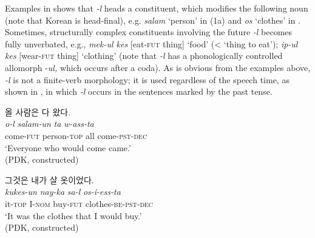 \documentclass[output=paper,colorlinks,citecolor=brown]{langscibook}
\begin{document}



Examples in  shows that \textit{-l} heads a constituent, which modifies the following noun (note that Korean is head-final), e.g. \textit{salam} ‘person’ in (1a) and \textit{os} ‘clothes’ in . Sometimes, structurally complex constituents involving the future \textit{-l} becomes fully unverbated, e.g., \textit{mek-ul kes }[eat-\textsc{fut} thing] ‘food’ (< ‘thing to eat’); \textit{ip-ul kes} [wear-\textsc{fut} thing] ‘clothing’ (note that \textit{-l} has a phonologically controlled allomorph -\textit{ul,} which occurs after a coda). As is obvious from the examples above, \textit{-l} is not a finite-verb morphology; it is used regardless of the speech time, as shown in , in which \textit{-l} occurs in the sentences marked by the past tense. 


\ea \label{ex:rhee:2}
    \ea \textkorean{올 사람은 다 왔다}.\\
    \gll \textit{o-l} \textit{salam-un} \textit{ta} \textit{w-ass-ta}\\
         come-\textsc{fut} person-\textsc{top} all come-\textsc{pst-dec}\\
    \glt `Everyone who would come came.'\\
    \hfill (PDK, constructed)

    \ex \textkorean{그것은 내가 살 옷이었다}.\\
    \gll \textit{kukes-un} \textit{nay-ka} \textit{sa-l} \textit{os-i-ess-ta}\\
         it-\textsc{top} I-\textsc{nom} buy-\textsc{fut} clothes-\textsc{be-pst-dec}\\
    \glt `It was the clothes that I would buy.'\\
    \hfill (PDK, constructed)
    \z
\z
\end{document}
